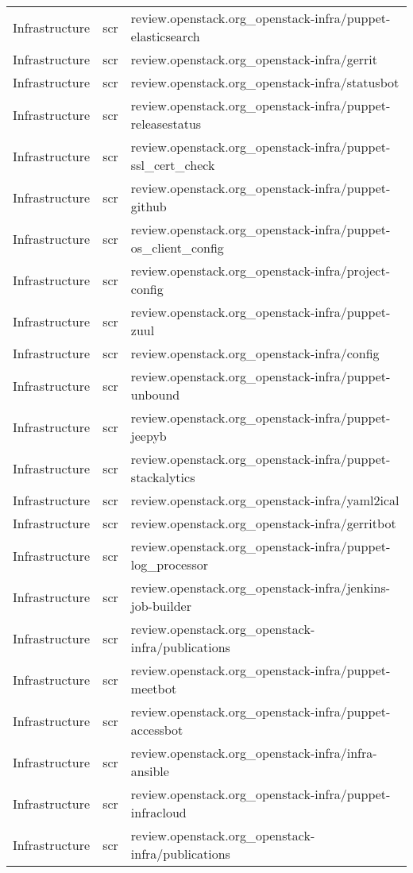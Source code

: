 \begin{center}
\begin{longtable}{|p{4cm}|p{1cm}|p{10cm}|}
Infrastructure&scr&review.openstack.org\_openstack-infra/puppet-elasticsearch\\ 
Infrastructure&scr&review.openstack.org\_openstack-infra/gerrit\\ 
Infrastructure&scr&review.openstack.org\_openstack-infra/statusbot\\ 
Infrastructure&scr&review.openstack.org\_openstack-infra/puppet-releasestatus\\ 
Infrastructure&scr&review.openstack.org\_openstack-infra/puppet-ssl\_cert\_check\\ 
Infrastructure&scr&review.openstack.org\_openstack-infra/puppet-github\\ 
Infrastructure&scr&review.openstack.org\_openstack-infra/puppet-os\_client\_config\\ 
Infrastructure&scr&review.openstack.org\_openstack-infra/project-config\\ 
Infrastructure&scr&review.openstack.org\_openstack-infra/puppet-zuul\\ 
Infrastructure&scr&review.openstack.org\_openstack-infra/config\\ 
Infrastructure&scr&review.openstack.org\_openstack-infra/puppet-unbound\\ 
Infrastructure&scr&review.openstack.org\_openstack-infra/puppet-jeepyb\\ 
Infrastructure&scr&review.openstack.org\_openstack-infra/puppet-stackalytics\\ 
Infrastructure&scr&review.openstack.org\_openstack-infra/yaml2ical\\ 
Infrastructure&scr&review.openstack.org\_openstack-infra/gerritbot\\ 
Infrastructure&scr&review.openstack.org\_openstack-infra/puppet-log\_processor\\ 
Infrastructure&scr&review.openstack.org\_openstack-infra/jenkins-job-builder\\ 
Infrastructure&scr&review.openstack.org\_openstack-infra/publications\\ 
Infrastructure&scr&review.openstack.org\_openstack-infra/puppet-meetbot\\ 
Infrastructure&scr&review.openstack.org\_openstack-infra/puppet-accessbot\\ 
Infrastructure&scr&review.openstack.org\_openstack-infra/infra-ansible\\ 
Infrastructure&scr&review.openstack.org\_openstack-infra/puppet-infracloud\\ 
Infrastructure&scr&review.openstack.org\_openstack-infra/publications\\ 

\end{longtable}
\end{center}
